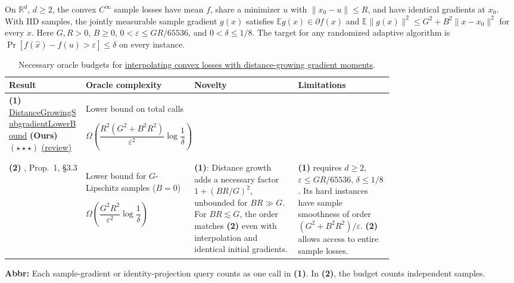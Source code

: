 \begin{table}[tp]
\centering
\caption{Necessary oracle budgets for \href{https://github.com/k3nfalt/longtails/blob/main/LongTails/Setups/InterpolatedDistanceGrowingSubgradient.lean}{interpolating convex losses with distance-growing gradient moments}.}\label{tab:InterpolatedDistanceGrowingSubgradient}
\parbox{\linewidth}{\footnotesize On $\mathbb R^d$, $d\ge2$, the convex $C^\infty$ sample losses have mean $f$, share a minimizer $u$ with $\|x_0-u\|\le R$, and have identical gradients at $x_0$. With IID samples, the jointly measurable sample gradient $g(x)$ satisfies $\mathbb E g(x)\in\partial f(x)$ and $\mathbb E\|g(x)\|^2\le G^2+B^2\|x-x_0\|^2$ for every $x$. Here $G,R>0$, $B\ge0$, $0<\varepsilon\le GR/65536$, and $0<\delta\le1/8$. The target for any randomized adaptive algorithm is $\Pr[f(\hat x)-f(u)>\varepsilon]\le\delta$ on every instance.}\par\smallskip
\begin{threeparttable}
\footnotesize
\setlength{\tabcolsep}{4pt}\renewcommand{\arraystretch}{1.25}
\begin{tabularx}{\linewidth}{@{}>{\raggedright\arraybackslash}p{0.20\linewidth}>{\raggedright\arraybackslash}p{0.28\linewidth}>{\raggedright\arraybackslash}p{0.27\linewidth}>{\raggedright\arraybackslash}X@{}}
\toprule
\textbf{Result} & \textbf{Oracle complexity} & \textbf{Novelty} & \textbf{Limitations} \\
\midrule
\textbf{(1)} \href{https://github.com/k3nfalt/longtails/blob/main/LongTails/Theorems/DistanceGrowingSubgradientLowerBound.lean}{Distance\allowbreak Growing\allowbreak Subgradient\allowbreak Lower\allowbreak Bound} \textbf{(Ours)} $(\star\star\star)$ \href{https://github.com/k3nfalt/longtails/blob/main/scripts/reviews/DistanceGrowingSubgradientLowerBound.md}{(review)}
& Lower bound on total calls\par $\Omega\!\left(\dfrac{R^2(G^2+B^2R^2)}{\varepsilon^2}\log\dfrac1\delta\right)$ & & \\
\midrule[1.2pt]
\textbf{(2)} \citep{idgsCarmonHinder2024v3}, Prop.\ 1, \S3.3
& Lower bound for $G$-Lipschitz samples ($B=0$)\par $\Omega\!\left(\dfrac{G^2R^2}{\varepsilon^2}\log\dfrac1\delta\right)$
& \textbf{(1)}: Distance growth adds a necessary factor $1+(BR/G)^2$, unbounded for $BR\gg G$. For $BR\lesssim G$, the order matches \textbf{(2)} even with interpolation and identical initial gradients.
& \textbf{(1)} requires $d\ge2$, $\varepsilon\le GR/65536$, $\delta\le1/8$. Its hard instances have sample smoothness of order $(G^2+B^2R^2)/\varepsilon$. \textbf{(2)} allows access to entire sample losses. \\
\bottomrule
\end{tabularx}
\begin{tablenotes}[flushleft]\footnotesize
\item[] \textbf{Abbr:} Each sample-gradient or identity-projection query counts as one call in \textbf{(1)}. In \textbf{(2)}, the budget counts independent samples.
\end{tablenotes}
\end{threeparttable}
\end{table}
